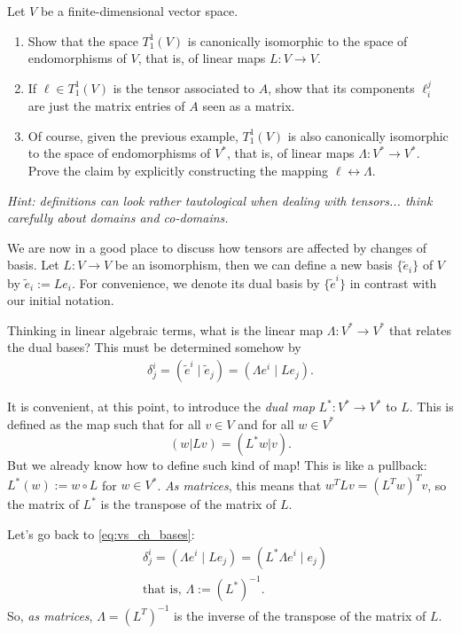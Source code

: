 \begin{exercise}\label{exe:iso_vs_endo}
  Let $V$ be a finite-dimensional vector space.
  \begin{enumerate}
    \item Show that the space $T^1_1(V)$ is canonically isomorphic to the space of endomorphisms of $V$, that is, of linear maps $L:V\to V$.

    \item If $\ell\in T^1_1(V)$ is the tensor associated to $A$, show that its components $\ell_i^j$ are just the matrix entries of $A$ seen as a matrix.

    \item Of course, given the previous example, $T^1_1(V)$ is also canonically isomorphic to the space of endomorphisms of $V^*$, that is, of linear maps $\Lambda:V^*\to V^*$.
          Prove the claim by explicitly constructing the mapping $\ell \leftrightarrow \Lambda$.
  \end{enumerate}
  \textit{\small Hint: definitions can look rather tautological when dealing with tensors... think carefully about domains and co-domains.}
\end{exercise}

We are now in a good place to discuss how tensors are affected by changes of basis.
Let $L: V\to V$ be an isomorphism, then we can define a new basis $\{\widetilde e_i\}$ of $V$ by $\widetilde e_i := L e_i$. For convenience, we denote its dual basis by $\{\widetilde e^i\}$ in contrast with our initial notation.

Thinking in linear algebraic terms, what is the linear map $\Lambda:V^*\to V^*$ that relates the dual bases? This must be determined somehow by
\begin{align}\label{eq:vs_ch_bases}
  \delta^i_j = (\widetilde e^i \mid \widetilde e_j) = (\Lambda e^i \mid L e_j).
\end{align}

It is convenient, at this point, to introduce the \emph{dual map} $L^* : V^* \to V^*$ to $L$.
This is defined as the map such that for all $v\in V$ and for all $w\in V^*$
\begin{equation}
  (w | Lv) = (L^* w | v).
\end{equation}
But we already know how to define such kind of map! This is like a pullback: $L^*(w) := w \circ L$ for $w\in V^*$.
\emph{As matrices}, this means that $w^T L v = (L^T w)^T v$, so the matrix of $L^*$ is the transpose of the matrix of $L$.

Let's go back to \eqref{eq:vs_ch_bases}:
\begin{align}
   & \delta_j^i = (\Lambda e^i \mid L e_j) = (L^* \Lambda e^i \mid e_j) \\
   & \mbox{that is, } \Lambda := (L^*)^{-1}.
\end{align}
So, \emph{as matrices}, $\Lambda = (L^T)^{-1}$ is the inverse of the transpose of the matrix of $L$.

